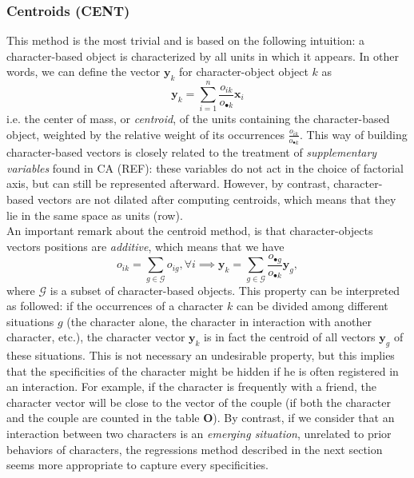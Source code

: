 \documentclass[
twocolumn,
]{ceurart}
\begin{document}
\subsubsection{Centroids (CENT)}
\label{centroid}

This method is the most trivial and is based on the following intuition: a character-based object is characterized by all units in which it appears. In other words, we can define the vector $\mathbf{y}_k$ for character-object object $k$ as
\begin{equation}
\mathbf{y}_k = \sum_{i=1}^n \frac{o_{ik}}{o_{\bullet k}} \mathbf{x}_i
\end{equation}
i.e. the center of mass, or \emph{centroid}, of the units containing the character-based object, weighted by the relative weight of its occurrences $\frac{o_{ik}}{o_{\bullet k}}$. This way of building character-based vectors is closely related to the treatment of \emph{supplementary variables} found in CA (REF): these variables do not act in the choice of factorial axis, but can still be represented afterward. However, by contrast, character-based vectors are not dilated after computing centroids, which means that they lie in the same space as units (row). \\
An important remark about the centroid method, is that character-objects vectors positions are \emph{additive}, which means that we have
\begin{equation}
o_{ik} = \sum_{g \in \mathcal{G}} o_{ig}, \forall i \implies \mathbf{y}_k = \sum_{g \in \mathcal{G}} \frac{o_{\bullet g}}{o_{\bullet k}} \mathbf{y}_g,
\end{equation}
where $\mathcal{G}$ is a subset of character-based objects. This property can be interpreted as followed: if the occurrences of a character $k$ can be divided among different situations $g$ (the character alone, the character in interaction with another character, etc.), the character vector $\mathbf{y}_k$ is in fact the centroid of all vectors $\mathbf{y}_g$ of these situations. This is not necessary an undesirable property, but this implies that the specificities of the character might be hidden if he is often registered in an interaction. For example, if the character is frequently with a friend, the character vector will be close to the vector of the couple (if both the character and the couple are counted in the table $\mathbf{O}$). By contrast, if we consider that an interaction between two characters is an \emph{emerging situation}, unrelated to prior behaviors of characters, the regressions method described in the next section seems more appropriate to capture every specificities.
\end{document}
